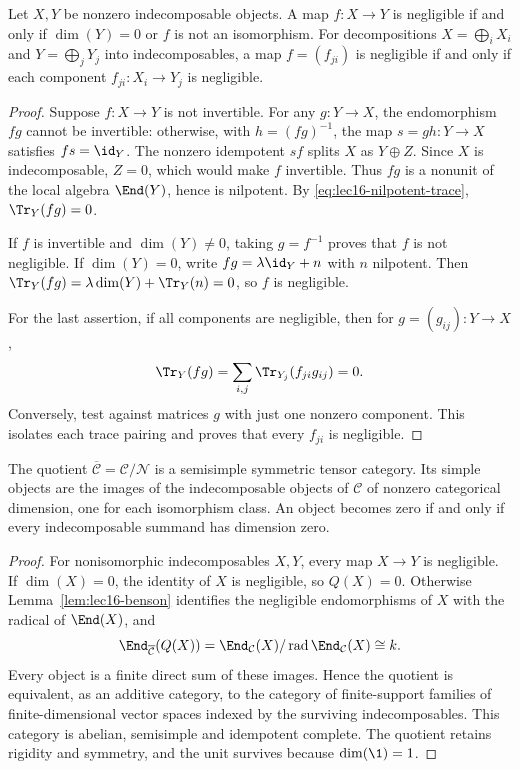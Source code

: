 \begin{lemma}\label{lem:lec16-benson}
Let $X,Y$ be nonzero indecomposable objects. A map $f:X\to Y$ is
negligible if and only if $\dim(Y)=0$ or $f$ is not an isomorphism.
For decompositions $X=\bigoplus_iX_i$ and $Y=\bigoplus_jY_j$ into
indecomposables, a map $f=(f_{ji})$ is negligible if and only if each
component $f_{ji}:X_i\to Y_j$ is negligible.
\end{lemma}
\begin{proof}
Suppose $f:X\to Y$ is not invertible. For any $g:Y\to X$, the
endomorphism $fg$ cannot be invertible: otherwise, with
$h=(fg)^{-1}$, the map $s=gh:Y\to X$ satisfies $fs=\id_Y$.
The nonzero idempotent $sf$ splits $X$ as $Y\oplus Z$. Since $X$ is
indecomposable, $Z=0$, which would make $f$ invertible.
Thus $fg$ is a nonunit of the local algebra $\End(Y)$, hence is
nilpotent. By \eqref{eq:lec16-nilpotent-trace}, $\Tr_Y(fg)=0$.

If $f$ is invertible and $\dim(Y)\ne0$, taking $g=f^{-1}$ proves
that $f$ is not negligible. If $\dim(Y)=0$, write
$fg=\lambda\id_Y+n$ with $n$ nilpotent. Then
$\Tr_Y(fg)=\lambda\dim(Y)+\Tr_Y(n)=0$, so $f$ is negligible.

For the last assertion, if all components are negligible, then for
$g=(g_{ij}):Y\to X$,
\[
 \Tr_Y(fg)=\sum_{i,j}\Tr_{Y_j}(f_{ji}g_{ij})=0.
\]
Conversely, test against matrices $g$ with just one nonzero component.
This isolates each trace pairing and proves that every $f_{ji}$ is
negligible.
\end{proof}

\begin{theorem}\label{thm:lec16-semisimplification}
The quotient $\overline{\mathcal C}=\mathcal C/\mathcal N$ is a
semisimple symmetric tensor category. Its simple objects are the images
of the indecomposable objects of $\mathcal C$ of nonzero categorical
dimension, one for each isomorphism class. An object becomes zero if
and only if every indecomposable summand has dimension zero.
\end{theorem}
\begin{proof}
For nonisomorphic indecomposables $X,Y$, every map $X\to Y$ is
negligible. If $\dim(X)=0$, the identity of $X$ is negligible, so
$Q(X)=0$. Otherwise Lemma~\ref{lem:lec16-benson} identifies the
negligible endomorphisms of $X$ with the radical of $\End(X)$, and
\[
 \End_{\overline{\mathcal C}}(Q(X))
       =\End_{\mathcal C}(X)/\operatorname{rad}\End_{\mathcal C}(X)
       \cong k.
\]
Every object is a finite direct sum of these images. Hence the quotient
is equivalent, as an additive category, to the category of finite-support
families of finite-dimensional vector spaces indexed by the surviving
indecomposables. This category is abelian, semisimple and idempotent
complete. The quotient retains rigidity and symmetry, and the unit
survives because $\dim(\1)=1$.
\end{proof}

